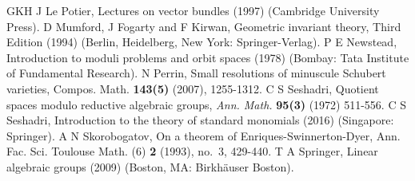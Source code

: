 \documentclass[12pt,reqno]{amsart}
\numberwithin{equation}{section}
\theoremstyle{definition}
\begin{document}
\begin{thebibliography}{GKH}
	J Le Potier, Lectures on vector bundles (1997) (Cambridge University Press).
	 D Mumford, J Fogarty and F Kirwan, {Geometric invariant theory}, Third Edition (1994) (Berlin, Heidelberg, New York: Springer-Verlag).
	 P E Newstead, {Introduction to moduli problems and orbit spaces} (1978) (Bombay: Tata Institute of Fundamental Research).
	 N Perrin, Small resolutions of minuscule Schubert varieties, Compos. Math. {\bf 143(5)} (2007), 1255-1312.
	 C S Seshadri, {Quotient spaces modulo reductive algebraic groups,} {\em Ann. Math.} {\bf 95(3)} (1972) 511-556.
	 C S Seshadri, {Introduction to the theory of standard monomials} (2016) (Singapore: Springer).
	A N Skorobogatov, On a theorem of Enriques-Swinnerton-Dyer, Ann. Fac. Sci. Toulouse Math. (6) {\bf 2} (1993), no.~3, 429-440.
	T A Springer, {Linear algebraic groups} (2009) (Boston, MA: Birkh\"{a}user Boston).
\end{thebibliography}	

%
%		 
		 
\end{document}
